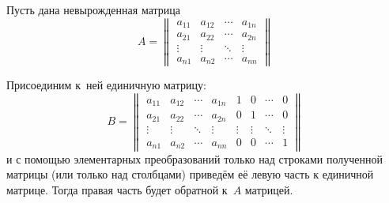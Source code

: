 \begin{theorem}
Пусть дана невырожденная матрица
\begin{equation*}
A =
\begin{Vmatrix}
a_{11} & a_{12} & \cdots & a_{1n} \\
a_{21} & a_{22} & \cdots & a_{2n} \\
\vdots & \vdots & \ddots & \vdots \\
a_{n1} & a_{n2} & \cdots & a_{nn}
\end{Vmatrix}
\end{equation*}

Присоединим к~ней единичную матрицу:
\begin{equation*}
B = \begin{Vmatrix}
a_{11} & a_{12} & \cdots & a_{1n} & 1 & 0 & \cdots & 0 \\
a_{21} & a_{22} & \cdots & a_{2n} & 0 & 1 & \cdots & 0 \\
\vdots & \vdots & \ddots & \vdots & \vdots & \vdots & \ddots & \vdots \\
a_{n1} & a_{n2} & \cdots & a_{nn} & 0 & 0 & \cdots & 1
\end{Vmatrix}
\end{equation*}
и с помощью элементарных преобразований только над строками полученной матрицы (или только над столбцами) приведём её левую часть к единичной матрице.
Тогда правая часть будет обратной к~$A$ матрицей.
\end{theorem}
